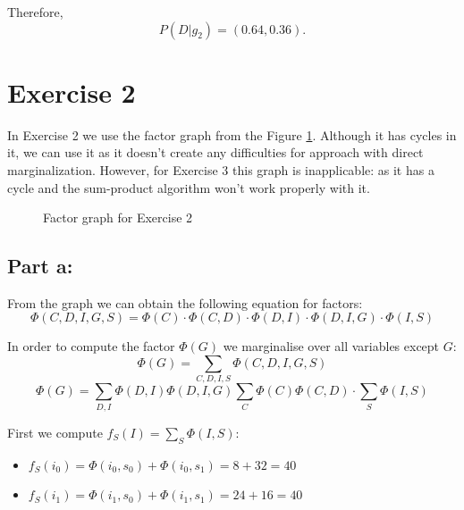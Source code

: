\documentclass[11pt,a4paper]{article}
\begin{document}
	Therefore, $$P(D | g_2) = (0.64, 0.36).$$
	
	\newpage
	\section*{Exercise 2}
	
	In Exercise 2 we use the factor graph from the Figure \ref{fig:fgraph_2}. Although it has cycles in it, we can use it as it doesn't create any difficulties for approach with direct marginalization. However, for Exercise 3 this graph is inapplicable: as it has a cycle and the sum-product algorithm won't work properly with it.

	\begin{figure}[H]
		\caption{Factor graph for Exercise 2}
		\label{fig:fgraph_2}
	\end{figure}
	
	\subsection*{Part a:}
	From the graph we can obtain the following equation for factors:
	$$\Phi(C,D,I,G,S) = \Phi(C) \cdot \Phi(C,D) \cdot \Phi(D,I) \cdot \Phi(D,I,G) \cdot \Phi(I,S)$$
	
	In order to compute the factor $\Phi(G)$ we marginalise over all variables except $G$:
	$$\Phi(G) = \sum_{C,D,I,S}\Phi(C,D,I,G,S)$$
	$$  \Phi(G)= \sum_{D, I} \Phi(D,I) \Phi(D,I,G)  \sum_{C}\Phi(C) \Phi(C,D) \cdot \sum_{S} \Phi(I,S)$$
	
	First we compute  $ f_S(I) = \sum_{S}\Phi(I,S):$
	\begin{itemize}
		\item $ f_S(i_0) = \Phi(i_0,s_0) + \Phi(i_0,s_1) = 8+32 = 40 $
		\item $ f_S(i_1) = \Phi(i_1,s_0) + \Phi(i_1,s_1) = 24+16 = 40 $
	\end{itemize}
	
\end{document}
